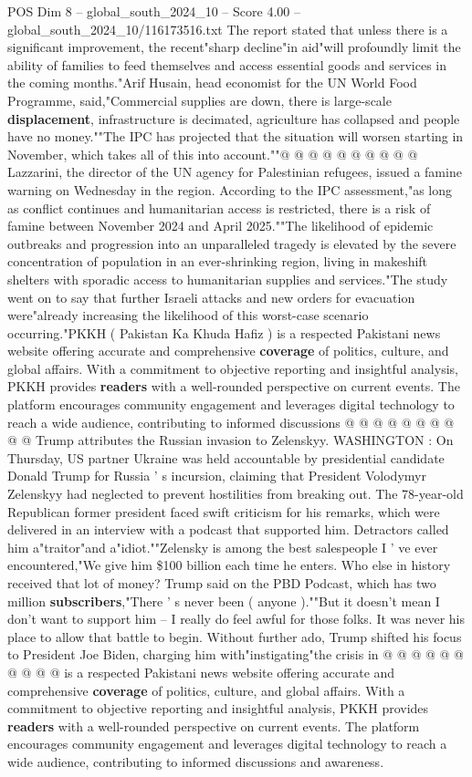 \begin{textsample}{POS Dim 8 – global\_south\_2024\_10 – Score 4.00 – global\_south\_2024\_10/116173516.txt}
The report stated that unless there is a significant improvement, the recent"sharp decline"in aid"will profoundly limit the ability of families to feed themselves and access essential goods and services in the coming months."Arif Husain, head economist for the UN World Food Programme, said,"Commercial supplies are down, there is large-scale \textbf{displacement}, infrastructure is decimated, agriculture has collapsed and people have no money.""The IPC has projected that the situation will worsen starting in November, which takes all of this into account.""@ @ @ @ @ @ @ @ @ @ Lazzarini, the director of the UN agency for Palestinian refugees, issued a famine warning on Wednesday in the region.
According to the IPC assessment,"as long as conflict continues and humanitarian access is restricted, there is a risk of famine between November 2024 and April 2025.""The likelihood of epidemic outbreaks and progression into an unparalleled tragedy is elevated by the severe concentration of population in an ever-shrinking region, living in makeshift shelters with sporadic access to humanitarian supplies and services."The study went on to say that further Israeli attacks and new orders for evacuation were"already increasing the likelihood of this worst-case scenario occurring."PKKH ( Pakistan Ka Khuda Hafiz ) is a respected Pakistani news website offering accurate and comprehensive \textbf{coverage} of politics, culture, and global affairs.
With a commitment to objective reporting and insightful analysis, PKKH provides \textbf{readers} with a well-rounded perspective on current events.
The platform encourages community engagement and leverages digital technology to reach a wide audience, contributing to informed discussions @ @ @ @ @ @ @ @ @ @ Trump attributes the Russian invasion to Zelenskyy.
WASHINGTON : On Thursday, US partner Ukraine was held accountable by presidential candidate Donald Trump for Russia ' s incursion, claiming that President Volodymyr Zelenskyy had neglected to prevent hostilities from breaking out.
The 78-year-old Republican former president faced swift criticism for his remarks, which were delivered in an interview with a podcast that supported him.
Detractors called him a"traitor"and a"idiot.""Zelensky is among the best salespeople I ' ve ever encountered,"We give him \$100 billion each time he enters.
Who else in history received that lot of money?
Trump said on the PBD Podcast, which has two million \textbf{subscribers},"There ' s never been ( anyone ).""But it doesn't mean I don't want to support him -- I really do feel awful for those folks.
It was never his place to allow that battle to begin.
Without further ado, Trump shifted his focus to President Joe Biden, charging him with"instigating"the crisis in @ @ @ @ @ @ @ @ @ @ is a respected Pakistani news website offering accurate and comprehensive \textbf{coverage} of politics, culture, and global affairs.
With a commitment to objective reporting and insightful analysis, PKKH provides \textbf{readers} with a well-rounded perspective on current events.
The platform encourages community engagement and leverages digital technology to reach a wide audience, contributing to informed discussions and awareness.


\end{textsample}
